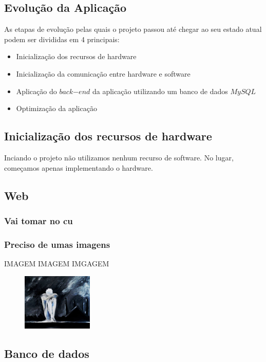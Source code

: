 \documentclass[conference, a4paper, 12pt]{IEEEtran}
\begin{document}
\subsection{Evolução da Aplicação}
As etapas de evolução pelas quais o projeto passou até chegar ao seu estado atual podem ser divididas em 4 principais:
\begin{itemize}
  \item Inicialização dos recursos de hardware
  \item Inicialização da comunicação entre hardware e software
  \item Aplicação do $back$$-$$end$ da aplicação utilizando um banco de dados $MySQL$
  \item Optimização da aplicação
\end{itemize}

\subsection{Inicialização dos recursos de hardware}
Inciando o projeto não utilizamos nenhum recurso de software. No lugar, começamos apenas implementando o hardware.

\subsection{Web}
\subsubsection{Vai tomar no cu}
\subsubsection{Preciso de umas imagens}
IMAGEM IMAGEM IMGAGEM

\begin{figure}[h]

  \begin{center}
    \includegraphics[width=0.30\textwidth]{help.jpeg}
  \end{center}
\end{figure}

\subsection{Banco de dados}
\end{document}

